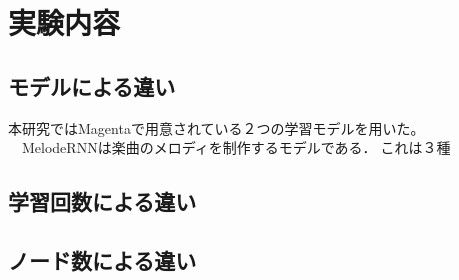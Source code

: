 \chapter{実験内容}
\section{モデルによる違い}
本研究ではMagentaで用意されている２つの学習モデルを用いた。
　MelodeRNNは楽曲のメロディを制作するモデルである．これは３種






\section{学習回数による違い}
\section{ノード数による違い}